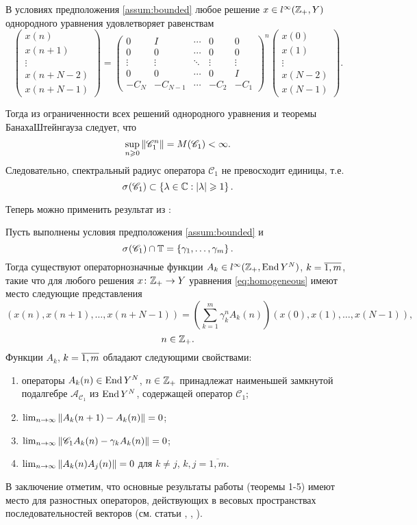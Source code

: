 В условиях предположения \ref{assum:bounded} любое решение $x \in l^\infty(\mathbb{Z}_+, Y)$ однородного уравнения удовлетворяет равенствам
\[
\begin{pmatrix}
x(n) \\
x(n + 1) \\
\vdots \\
x(n + N - 2) \\
x(n + N - 1)
\end{pmatrix}
=
\begin{pmatrix}
    0 & I  & \cdots & 0 & 0 \\
    0 & 0  & \cdots & 0 & 0 \\
    \vdots & \vdots & \ddots & \vdots & \vdots \\
    0 & 0 & \cdots & 0 & I \\
    -C_N & -C_{N-1} & \cdots & -C_2 & -C_1
   \end{pmatrix}^{\displaystyle n}
   \begin{pmatrix}
    x(0) \\
    x(1) \\
    \vdots \\
    x(N - 2) \\
    x(N - 1)
   \end{pmatrix}.
   \]

Тогда из ограниченности всех решений однородного уравнения и теоремы Банаха\-Штейнгауза следует, что
\[ \sup_{n\geqslant 0} \left\|\mathcal C_1^n\right\| = M(\mathcal C_1) < \infty.\]
Следовательно, спектральный радиус оператора $\mathcal C_1$ не превосходит единицы, т.е.
\[ \spectrum{\mathcal C_1} \subset \menge{\lambda \in \fieldc : \absv{\lambda} \geq 1}. \]

Теперь можно применить результат из \cite[теорема 1]{Bas15}:
\begin{theorem}\label{th:asymptotic}
    Пусть выполнены условия предположения \ref{assum:bounded} и 
    \[ \spectrum{\mathcal C_1} \cap \groupt = \menge{\gamma_1, \dotsc, \gamma_m}.\] 
    Тогда существуют операторнозначные функции $A_k \in l^\infty(\mathbb{Z}_+, \operatorname{End}{Y^N})$, $k \hm= \overline{1,m}$, такие что для любого решения $x \colon \mathbb{Z}_+ \to Y$ уравнения \ref{eq:homogeneous} имеют место следующие представления
    \[ (x(n), x(n+1), \dotsc, x(n+N-1)) = \left(\sum_{k=1}^m \gamma_k^n A_k(n) \right) (x(0), x(1), \dotsc, x(N-1)),\]
    \[n \in \mathbb{Z}_+.\]
    Функции $A_k$, $k \hm= \overline{1,m}$ обладают следующими свойствами:
    \begin{enumerate}
    \item операторы $A_k(n) \in \operatorname{End}{Y^N}$, $n \in \mathbb{Z}_+$ принадлежат наименьшей замкнутой подалгебре $\mathcal A_{\mathcal C_1}$ из $\operatorname{End} Y^N$, содержащей оператор $\mathcal C_1$;
    \item $\lim_{n\to \infty} {\left\|A_k(n+1) - A_k(n)\right\|} = 0$;
    \item $\lim_{n\to \infty} {\left\|\mathcal C_1 A_k(n) - \gamma_k A_k(n)\right\|} = 0$;
    \item $\lim_{n\to \infty} {\left\|A_k(n) A_j(n)\right\|} = 0$ для $k \neq j$, $k, j = \overline{1,m}$.
    \end{enumerate}
\end{theorem}

В заключение отметим, что основные результаты работы (теоремы 1-5) имеют место
для разностных операторов, действующих в весовых пространствах
последовательностей векторов (см. статьи \cite{Bic10}, \cite{Bic13}, \cite{Bic14}).
